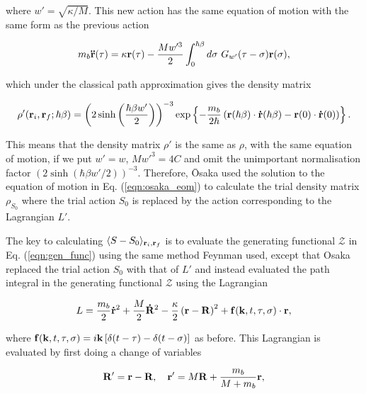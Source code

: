 where $w' = \sqrt{\kappa / M}$. This new action has the same equation of motion with the same form as the previous action

\begin{equation}\label{eqn:osaka_eom}
    m_b \vb{\ddot{r}}(\tau) = \kappa \vb{r}(\tau) - \frac{Mw'^3}{2} \int^{\hbar\beta}_0 d\sigma\ G_{w'}(\tau - \sigma) \vb{r}(\sigma),
\end{equation}

which under the classical path approximation gives the density matrix

\begin{equation}
    \rho'(\vb{r}_i, \vb{r}_f; \hbar\beta) = \left(2 \sinh\left(\frac{\hbar\beta w'}{2}\right)\right)^{-3} \exp \left\{-\frac{m_b}{2\hbar}\left( \vb{r}(\hbar\beta) \cdot \vb{\dot{r}}(\hbar\beta) - \vb{r}(0) \cdot \vb{\dot{r}}(0) \right)\right\}.
\end{equation}

This means that the density matrix $\rho'$ is the same as $\rho$, with the same equation of motion, if we put $w' = w$, $Mw'^3 = 4C$ and omit the unimportant normalisation factor $(2 \sinh (\hbar \beta w' / 2))^{-3}$. Therefore, \=Osaka used the solution to the equation of motion in Eq. (\ref{eqn:osaka_eom}) to calculate the trial density matrix $\rho_{S_0}$ where the trial action $S_0$ is replaced by the action corresponding to the Lagrangian $L'$. 

The key to calculating $\langle S - S_0 \rangle_{\vb{r}_i, \vb{r}_f}$ is to evaluate the generating functional $\mathcal{Z}$ in Eq. (\ref{eqn:gen_func}) using the same method Feynman used, except that Osaka replaced the trial action $S_0$ with that of $L'$ and instead evaluated the path integral in the generating functional $\mathcal{Z}$ using the Lagrangian

\begin{equation}\label{eqn:osaka_lag_f}
    L = \frac{m_b}{2} \vb{\dot{r}}^2 + \frac{M}{2}\vb{\dot{R}}^2 - \frac{\kappa}{2} \left( \vb{r} - \vb{R} \right)^2 + \vb{f}(\vb{k}, t, \tau, \sigma) \cdot \vb{r},
\end{equation}

where $\vb{f}(\vb{k}, t, \tau, \sigma) = i \vb{k} \left[ \delta(t-\tau) - \delta(t-\sigma) \right]$ as before. This Lagrangian is evaluated by first doing a change of variables

\begin{equation}
    \vb{R'} = \vb{r} - \vb{R}, \quad \vb{r'} = M \vb{R} + \frac{m_b}{M + m_b} \vb{r},
\end{equation}

